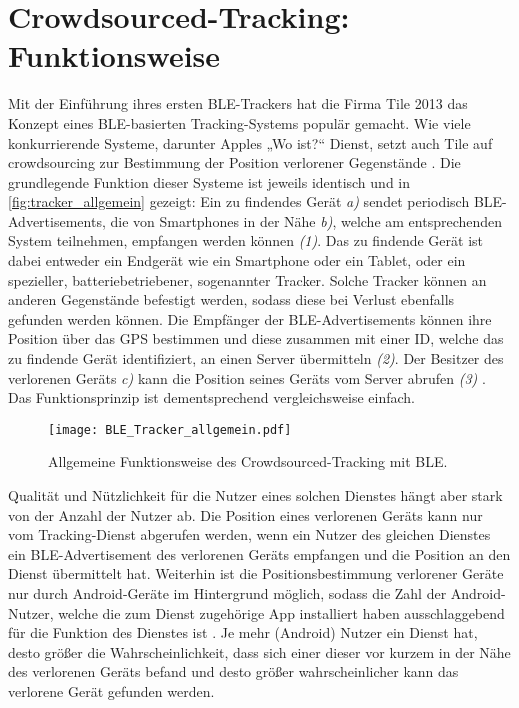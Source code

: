 \section{Crowdsourced-Tracking: Funktionsweise}
\label{sec:Funktionsweise}

Mit der Einführung ihres ersten \ac{BLE}-Trackers hat die Firma Tile 2013 das Konzept eines \ac{BLE}-basierten Tracking-Systems populär gemacht.
Wie viele konkurrierende Systeme, darunter Apples „Wo ist?“ Dienst, setzt auch Tile auf crowdsourcing zur Bestimmung der Position verlorener Gegenstände \cite{Weller_BLE_Finders}.
Die grundlegende Funktion dieser Systeme ist jeweils identisch und in \autoref{fig:tracker_allgemein} gezeigt: Ein zu findendes Gerät \textit{a)} sendet periodisch \ac{BLE}-Advertisements, die von Smartphones in der Nähe \textit{b)}, welche am entsprechenden System teilnehmen, empfangen werden können \textit{(1)}.
Das zu findende Gerät ist dabei entweder ein Endgerät wie ein Smartphone oder ein Tablet, oder ein spezieller, batteriebetriebener, sogenannter Tracker.
Solche Tracker können an anderen Gegenstände befestigt werden, sodass diese bei Verlust ebenfalls gefunden werden können.
Die Empfänger der \ac{BLE}-Advertisements können ihre Position über das \ac{GPS} bestimmen und diese zusammen mit einer ID, welche das zu findende Gerät identifiziert, an einen Server übermitteln \textit{(2)}.
Der Besitzer des verlorenen Geräts \textit{c)} kann die Position seines Geräts vom Server abrufen \textit{(3)} \cite{Garg_Secure_Tracker}.
Das Funktionsprinzip ist dementsprechend vergleichsweise einfach.
\begin{figure}[ht]
    \centering 
    \texttt{[image: BLE\_Tracker\_allgemein.pdf]}
    \caption{Allgemeine Funktionsweise des Crowdsourced-Tracking mit \ac{BLE}.}
    \label{fig:tracker_allgemein}
\end{figure}
Qualität und Nützlichkeit für die Nutzer eines solchen Dienstes hängt aber stark von der Anzahl der Nutzer ab.
Die Position eines verlorenen Geräts kann nur vom Tracking-Dienst abgerufen werden, wenn ein Nutzer des gleichen Dienstes ein \ac{BLE}-Advertisement des verlorenen Geräts empfangen und die Position an den Dienst übermittelt hat.
Weiterhin ist die Positionsbestimmung verlorener Geräte nur durch Android-Geräte im Hintergrund möglich, sodass die Zahl der Android-Nutzer, welche die zum Dienst zugehörige App installiert haben ausschlaggebend für die Funktion des Dienstes ist \cite{Heinrich_AirGuard}.
Je mehr (Android) Nutzer ein Dienst hat, desto größer die Wahrscheinlichkeit, dass sich einer dieser vor kurzem in der Nähe des verlorenen Geräts befand und desto größer wahrscheinlicher kann das verlorene Gerät gefunden werden.


